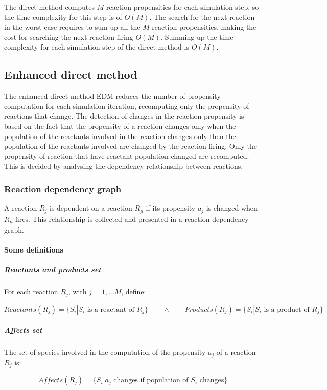     The direct method computes $M$ reaction propensities for each simulation step, so the time complexity for this step is of $O(M)$.
    The search for the next reaction in the worst case requires to sum up all the $M$ reaction propensities, making the cost for searching the next reaction firing $O(M)$.
    Summing up the time complexity for each simulation step of the direct method is $O(M)$.

  \subsection{Enhanced direct method}
  The enhanced direct method EDM reduces the number of propensity computation for each simulation iteration, recomputing only the propensity of reactions that change.
  The detection of changes in the reaction propensity is based on the fact that the propensity of a reaction changes only when the population of the reactants involved in the reaction changes only then the population of the reactants involved are changed by the reaction firing.
  Only the propensity of reaction that have reactant population changed are recomputed.
  This is decided by analysing the dependency relationship between reactions.

    \subsubsection{Reaction dependency graph}
    A reaction $R_j$ is dependent on a reaction $R_\mu$ if its propensity $a_j$ is changed when $R_\mu$ fires.
    This relationship is collected and presented in a reaction dependency graph.

      \paragraph{Some definitions}

        \subparagraph{Reactants and products set}
        For each reaction $R_j$, with $j = 1,\dots M$, define:

        $$Reactants(R_j) = \{S_i|S_i\text{ is a reactant of }R_j\}\qquad\land\qquad Products(R_j) = \{S_i|S_i\text{ is a product of }R_j\}$$

        \subparagraph{Affects set}
        The set of species involved in the computation of the propensity $a_j$ of a reaction $R_j$ is:

        $$Affects(R_j) = \{S_i|a_j\text{ changes if population of }S_i\text{ changes}\}$$

